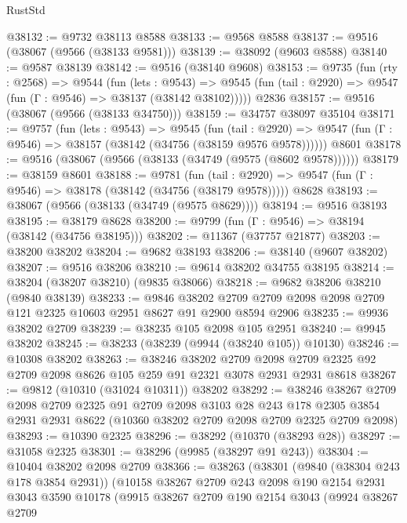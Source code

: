 \begin{lexlean}{RustStd}
\begin{coremodule}
@38132 := @9732 @38113 @8588
@38133 := @9568 @8588
@38137 := @9516 (@38067 (@9566 (@38133 @9581)))
@38139 := @38092 (@9603 @8588)
@38140 := @9587 @38139
@38142 := @9516 (@38140 @9608)
@38153 := @9735
    (fun (rty : @2568) =>
    @9544
      (fun (lets : @9543) =>
      @9545 (fun (tail : @2920) => @9547 (fun (Γ : @9546) => @38137 (@38142 @38102)))))
    @2836
@38157 := @9516 (@38067 (@9566 (@38133 @34750)))
@38159 := @34757 @38097 @35104
@38171 := @9757
    (fun (lets : @9543) =>
    @9545
      (fun (tail : @2920) =>
      @9547 (fun (Γ : @9546) => @38157 (@38142 (@34756 (@38159 @9576 @9578))))))
    @8601
@38178 := @9516 (@38067 (@9566 (@38133 (@34749 (@9575 (@8602 @9578))))))
@38179 := @38159 @8601
@38188 := @9781
    (fun (tail : @2920) => @9547 (fun (Γ : @9546) => @38178 (@38142 (@34756 (@38179 @9578)))))
    @8628
@38193 := @38067 (@9566 (@38133 (@34749 (@9575 @8629))))
@38194 := @9516 @38193
@38195 := @38179 @8628
@38200 := @9799 (fun (Γ : @9546) => @38194 (@38142 (@34756 @38195)))
@38202 := @11367 (@37757 @21877)
@38203 := @38200 @38202
@38204 := @9682 @38193
@38206 := @38140 (@9607 @38202)
@38207 := @9516 @38206
@38210 := @9614 @38202 @34755 @38195
@38214 := @38204 (@38207 @38210) (@9835 @38066)
@38218 := @9682 @38206 @38210 (@9840 @38139)
@38233 := @9846
    @38202
    @2709
    @2709
    @2098
    @2098
    @2709
    @121
    @2325
    @10603
    @2951
    @8627
    @91
    @2900
    @8594
    @2906
@38235 := @9936 @38202 @2709
@38239 := @38235 @105 @2098 @105 @2951
@38240 := @9945 @38202
@38245 := @38233 (@38239 (@9944 (@38240 @105)) @10130)
@38246 := @10308 @38202
@38263 := @38246
    @38202
    @2709
    @2098
    @2709
    @2325
    @92
    @2709
    @2098
    @8626
    @105
    @259
    @91
    @2321
    @3078
    @2931
    @2931
    @8618
@38267 := @9812 (@10310 (@31024 @10311)) @38202
@38292 := @38246
    @38267
    @2709
    @2098
    @2709
    @2325
    @91
    @2709
    @2098
    @3103
    @28
    @243
    @178
    @2305
    @3854
    @2931
    @2931
    @8622
    (@10360 @38202 @2709 @2098 @2709 @2325 @2709 @2098)
@38293 := @10390 @2325
@38296 := @38292 (@10370 (@38293 @28))
@38297 := @31058 @2325
@38301 := @38296 (@9985 (@38297 @91 @243))
@38304 := @10404 @38202 @2098 @2709
@38366 := @38263
    (@38301
      (@9840 (@38304 @243 @178 @3854 @2931))
      (@10158
        @38267
        @2709
        @243
        @2098
        @190
        @2154
        @2931
        @3043
        @3590
        @10178
        (@9915
          @38267
          @2709
          @190
          @2154
          @3043
          (@9924
            @38267
            @2709

\end{coremodule}
\end{lexlean}
